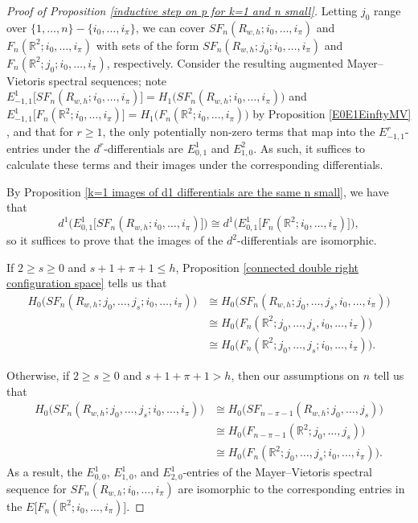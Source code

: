 \documentclass[pagebackref,colorlinks,citecolor=blue,linkcolor=blue,urlcolor=blue,filecolor=blue]{article}
\theoremstyle{definition}\newtheorem{definition}[thm]{Definition}
\theoremstyle{definition}
\newcommand{\R}{\ensuremath{\mathbb{R}}}
\begin{document}
\begin{proof}[Proof of Proposition \ref{inductive step on p for k=1 and n small}]
Letting $j_{0}$ range over $\{1, \dots, n\}-\{i_{0}, \dots, i_{\pi}\}$, we can cover $SF_{n}(R_{w,h}; i_{0}, \dots, i_{\pi})$ and $F_{n}(\R^{2}; i_{0}, \dots, i_{\pi})$ with sets of the form $SF_{n}(R_{w, h}; j_{0}; i_{0}, \dots, i_{\pi})$ and $F_{n}(\R^{2}; j_{0}; i_{0}, \dots, i_{\pi})$, respectively.
Consider the resulting augmented Mayer--Vietoris spectral sequences; note
$E^{1}_{-1,1}\big[SF_{n}(R_{w, h};i_{0},\dots, i_{\pi})\big]=H_{1}\big(SF_{n}(R_{w, h};i_{0},\dots, i_{\pi})\big)$ and $E^{1}_{-1,1}\big[F_{n}(\R^{2};i_{0},\dots, i_{\pi})\big]=H_{1}\big(F_{n}(\R^{2};i_{0},\dots, i_{\pi})\big)$ by Proposition \ref{E0E1EinftyMV} , and that for $r\ge 1$, the only potentially non-zero terms that map into the $E^{r}_{-1,1}$-entries under the $d^{r}$-differentials are $E^{1}_{0,1}$ and $E^{2}_{1,0}$.
As such, it suffices to calculate these terms and their images under the corresponding differentials. 

By Proposition \ref{k=1 images of d1 differentials are the same n small}, we have that 
\[
d^{1}\Big(E^{1}_{0,1}\big[SF_{n}(R_{w, h}; i_{0}, \dots, i_{\pi})\big]\Big)\cong d^{1}\Big(E^{1}_{0,1}\big[F_{n}(\R^{2}; i_{0}, \dots, i_{\pi})\big]\Big),
\]
so it suffices to prove that the images of the $d^{2}$-differentials are isomorphic.


If $2\ge s\ge 0$ and $s+1+\pi+1\le h$, Proposition \ref{connected double right configuration space} tells us that
\begin{align*}
H_{0}\big(SF_{n}(R_{w, h};j_{0}, \dots, j_{s};i_{0},\dots, i_{\pi})\big)&\cong H_{0}\big(SF_{n}(R_{w, h};j_{0}, \dots, j_{s}, i_{0},\dots, i_{\pi})\big)\\ &\cong H_{0}\big(F_{n}(\R^{2};j_{0}, \dots, j_{s}, i_{0},\dots, i_{\pi})\big)\\
&\cong H_{0}\big(F_{n}(\R^{2};j_{0}, \dots, j_{s}; i_{0},\dots, i_{\pi})\big).
\end{align*}

Otherwise, if $2\ge s\ge 0$ and  $s+1+\pi+1> h$, then our assumptions on $n$ tell us that
\begin{align*}
H_{0}\big(SF_{n}(R_{w, h};j_{0}, \dots, j_{s};i_{0},\dots, i_{\pi})\big)&\cong H_{0}\big(SF_{n-\pi-1}(R_{w, h};j_{0}, \dots, j_{s})\big)\\ &\cong H_{0}\big(F_{n-\pi-1}(\R^{2};j_{0}, \dots, j_{s})\big)\\
&\cong H_{0}\big(F_{n}(\R^{2};j_{0}, \dots, j_{s}; i_{0},\dots, i_{\pi})\big).
\end{align*}
As a result, the $E^{1}_{0,0}$, $E^{1}_{1,0}$, and $E^{1}_{2,0}$-entries of the Mayer--Vietoris spectral sequence for $SF_{n}(R_{w,h}; i_{0}, \dots, i_{\pi})$ are isomorphic to the corresponding entries in the $E\big[F_{n}(\R^{2}; i_{0}, \dots, i_{\pi})\big]$.


\end{proof}
\end{document}
